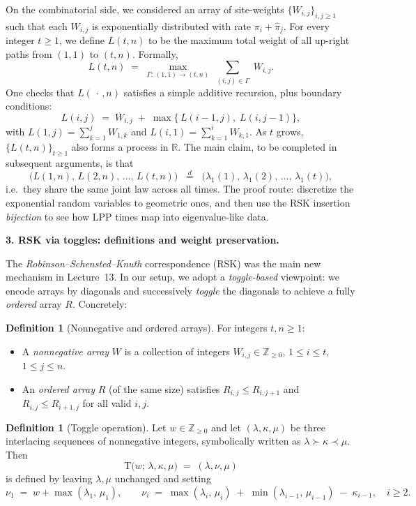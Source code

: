 \documentclass[letterpaper,11pt,oneside,reqno]{article}
\numberwithin{equation}{section}
\theoremstyle{definition}
\newtheorem{definition}[proposition]{Definition}
\begin{document}
On the combinatorial side, we considered an array of site-weights $\{W_{i,j}\}_{i,j\ge1}$ such that each $W_{i,j}$ is exponentially distributed with rate $\pi_i + \hat\pi_j$.  For every integer $t\ge1$, we define $L(t,n)$ to be the maximum total weight of all up-right paths from $(1,1)$ to $(t,n)$.  Formally,
\[
L(t,n)\;=\;\max_{\Gamma:\,(1,1)\to(t,n)} \;\sum_{(i,j)\in\Gamma}\; W_{i,j}.
\]
One checks that $L(\,\cdot\,,n)$ satisfies a simple additive recursion, plus boundary conditions:
\[
L(i,j)
\;=\;
W_{i,j}\;+\;\max\bigl\{\,L(i-1,j),\;L(i,j-1)\bigr\},
\]
with $L(1,j)=\sum_{k=1}^j W_{1,k}$ and $L(i,1)=\sum_{k=1}^i W_{k,1}$.  As $t$ grows, $\{L(t,n)\}_{t\ge1}$ also forms a process in $\mathbb{R}$.  The main claim, to be completed in subsequent arguments, is that
\[
\bigl(L(1,n),\,L(2,n),\,\dots,\,L(t,n)\bigr)
\;\;\stackrel{d}{=}\;\;
\bigl(\lambda_1(1),\,\lambda_1(2),\,\dots,\,\lambda_1(t)\bigr),
\]
i.e.\ they share the same joint law across all times.  The proof route: discretize the exponential random variables to geometric ones, and then use the RSK insertion \emph{bijection} to see how LPP times map into eigenvalue-like data.

\vspace{6pt}
\noindent
\textbf{3. RSK via toggles: definitions and weight preservation.}
\vspace{4pt}

The \emph{Robinson--Schensted--Knuth} correspondence (RSK) was the main new mechanism in Lecture~13.  In our setup, we adopt a \emph{toggle-based} viewpoint: we encode arrays by diagonals and successively \emph{toggle} the diagonals to achieve a fully \emph{ordered} array $R$.  Concretely:

\begin{definition}[Nonnegative and ordered arrays]
For integers $t,n\ge1$:
\begin{itemize}
\item A \emph{nonnegative array} $W$ is a collection of integers $W_{i,j}\in \mathbb{Z}_{\ge 0}$, $1\le i\le t$, $1\le j\le n$.
\item An \emph{ordered array} $R$ (of the same size) satisfies $R_{i,j}\le R_{i,j+1}$ and $R_{i,j}\le R_{i+1,j}$ for all valid $i,j$.
\end{itemize}
\end{definition}

\begin{definition}[Toggle operation]
Let $w\in\mathbb{Z}_{\ge0}$ and let $(\lambda,\kappa,\mu)$ be three interlacing sequences of nonnegative integers, symbolically written as $\lambda\succ\kappa\prec\mu$.  Then
\[
\mathrm{T}\bigl(w;\,\lambda,\kappa,\mu\bigr) \;=\; (\lambda,\nu,\mu)
\]
is defined by leaving $\lambda,\mu$ unchanged and setting
\[
\nu_{1} \;=\; w + \max(\lambda_{1},\,\mu_{1}),
\qquad
\nu_{i} \;=\;\max(\lambda_{i},\,\mu_{i})
\;+\;\min(\lambda_{i-1},\,\mu_{i-1})
\;-\;\kappa_{i-1},
\quad i\ge 2.
\]
\end{definition}
\end{document}
